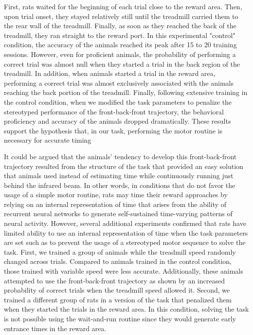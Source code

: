 First, rats waited for the beginning of each trial close to the reward area.
Then, upon trial onset, they stayed relatively still until the treadmill carried them to the rear wall of the treadmill.
Finally, as soon as they reached the back of the treadmill, they ran straight to the reward port.
In this experimental "control" condition, the accuracy of the animals reached its peak after 15 to 20 training sessions.
However, even for proficient animals, the probability of performing a correct trial was almost null when they started a trial in the back region of the treadmill.
In addition, when animals started a trial in the reward area, performing a correct trial was almost exclusively associated with the animals reaching the back portion of the treadmill.
Finally, following extensive training in the control condition, when we modified the task parameters to penalize the stereotyped performance of the front-back-front trajectory, the behavioral proficiency and accuracy of the animals dropped dramatically.
These results support the hypothesis that, in our task, performing the motor routine is necessary for accurate timing
\par
It could be argued that the animals' tendency to develop this front-back-front trajectory resulted from the structure of the task that provided an easy solution that animals used instead of estimating time while continuously running just behind the infrared beam.
In other words, in conditions that do not favor the usage of a simple motor routine, rats may time their reward approaches by relying on an internal representation of time that arises from the ability of recurrent neural networks to generate self-sustained time-varying patterns of neural activity\cite{BuonomanoTICS2010}.
However, several additional experiments confirmed that rats have limited ability to use an internal representation of time when the task parameters are set such as to prevent the usage of a stereotyped motor sequence to solve the task.
First, we trained a group of animals while the treadmill speed randomly changed across trials.
Compared to animals trained in the control condition, those trained with variable speed were less accurate.
Additionally, these animals attempted to use the front-back-front trajectory as shown by an increased probability of correct trials when the treadmill speed allowed it.
Second, we trained a different group of rats in a version of the task that penalized them when they started the trials in the reward area.
In this condition, solving the task is not possible using the wait-and-run routine since they would generate early entrance times in the reward area.
